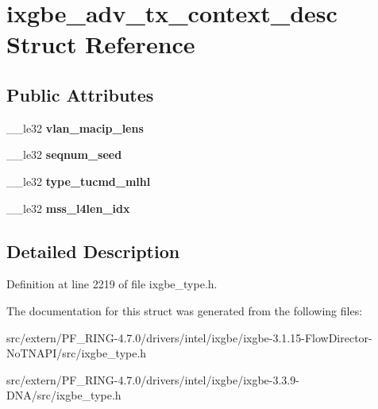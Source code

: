 \hypertarget{structixgbe__adv__tx__context__desc}{
\section{ixgbe\_\-adv\_\-tx\_\-context\_\-desc Struct Reference}
\label{structixgbe__adv__tx__context__desc}
}
\subsection*{Public Attributes}
\begin{DoxyCompactItemize}
\item 
\hypertarget{structixgbe__adv__tx__context__desc_ad0a1042a8bdb8159af7913e4b9a4eb1f}{
\_\-\_\-le32 {\bfseries vlan\_\-macip\_\-lens}}
\label{structixgbe__adv__tx__context__desc_ad0a1042a8bdb8159af7913e4b9a4eb1f}

\item 
\hypertarget{structixgbe__adv__tx__context__desc_aba00b1bef7b7ce24e9c162d92fa8818e}{
\_\-\_\-le32 {\bfseries seqnum\_\-seed}}
\label{structixgbe__adv__tx__context__desc_aba00b1bef7b7ce24e9c162d92fa8818e}

\item 
\hypertarget{structixgbe__adv__tx__context__desc_abff5be67ec8f8a7ca4069c846bff06c1}{
\_\-\_\-le32 {\bfseries type\_\-tucmd\_\-mlhl}}
\label{structixgbe__adv__tx__context__desc_abff5be67ec8f8a7ca4069c846bff06c1}

\item 
\hypertarget{structixgbe__adv__tx__context__desc_a6bc42ef8fea01a0c5e3dafe5b720b542}{
\_\-\_\-le32 {\bfseries mss\_\-l4len\_\-idx}}
\label{structixgbe__adv__tx__context__desc_a6bc42ef8fea01a0c5e3dafe5b720b542}

\end{DoxyCompactItemize}


\subsection{Detailed Description}


Definition at line 2219 of file ixgbe\_\-type.h.



The documentation for this struct was generated from the following files:\begin{DoxyCompactItemize}
\item 
src/extern/PF\_\-RING-\/4.7.0/drivers/intel/ixgbe/ixgbe-\/3.1.15-\/FlowDirector-\/NoTNAPI/src/ixgbe\_\-type.h\item 
src/extern/PF\_\-RING-\/4.7.0/drivers/intel/ixgbe/ixgbe-\/3.3.9-\/DNA/src/ixgbe\_\-type.h\end{DoxyCompactItemize}
